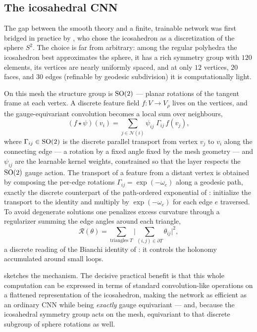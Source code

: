 \subsection{The icosahedral CNN}
\label{sec:gauge:icosahedral}

The gap between the smooth theory and a finite, trainable network was first
bridged in practice by \citet{cohen2019gaugeequivariantconvolutional}, who chose
the icosahedron as a discretization of the sphere $S^2$. The choice is far from
arbitrary: among the regular polyhedra the icosahedron best approximates the
sphere, it has a rich symmetry group with $120$ elements, its vertices are
nearly uniformly spaced, and at only $12$ vertices, $20$ faces, and $30$ edges
(refinable by geodesic subdivision) it is computationally light.

On this mesh the structure group is $\operatorname{SO}(2)$ --- planar rotations of the tangent
frame at each vertex. A discrete feature field $f\colon V \to V_\rho$ lives on
the vertices, and the gauge-equivariant convolution becomes a local sum over
neighbours,
\[
  (f \star \psi)(v_i) = \sum_{j \in \mathcal{N}(i)}
    \psi_{ij}\; \Gamma_{ij}\, f(v_j),
\]
where $\Gamma_{ij} \in \operatorname{SO}(2)$ is the discrete parallel transport from vertex
$v_j$ to $v_i$ along the connecting edge --- a rotation by a fixed angle fixed by
the mesh geometry --- and $\psi_{ij}$ are the learnable kernel weights,
constrained so that the layer respects the $\operatorname{SO}(2)$ gauge action. The transport
of a feature from a distant vertex is obtained by composing the per-edge
rotations $\Gamma_{ij} = \exp(-\omega_e)$ along a geodesic path, exactly the
discrete counterpart of the path-ordered exponential of
: initialize the transport to the identity and multiply
by $\exp(-\omega_e)$ for each edge $e$ traversed. To avoid degenerate solutions
one penalizes excess curvature through a regularizer summing the edge angles
around each triangle,
\[
  \mathcal{R}(\theta) = \sum_{\text{triangles } T}
    \Big|\sum_{(i,j) \in \partial T} \theta_{ij}\Big|^2,
\]
a discrete reading of the Bianchi identity of : it
controls the holonomy accumulated around small loops.

 sketches the mechanism. The decisive practical
benefit is that this whole computation can be expressed in terms of standard
convolution-like operations on a flattened representation of the icosahedron,
making the network as efficient as an ordinary CNN while being \emph{exactly}
gauge equivariant --- and, because the icosahedral symmetry group acts on the
mesh, equivariant to that discrete subgroup of sphere rotations as well.

